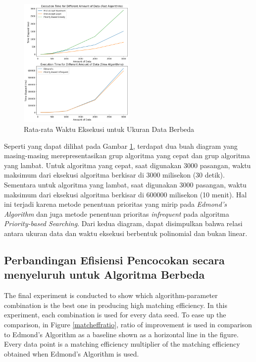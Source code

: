 \documentclass[conference]{IEEEtran}
\begin{document}
\begin{figure}[h]
    \includegraphics[width=0.5\textwidth]{images/execution_time_for_different_amount_of_data.png}
    \caption{Rata-rata Waktu Eksekusi untuk Ukuran Data Berbeda}
    \label{exctimedata}
\end{figure}

Seperti yang dapat dilihat pada Gambar \ref{exctimedata}, terdapat dua buah diagram yang masing-masing merepresentasikan grup
algoritma yang cepat dan grup algoritma yang lambat. Untuk algoritma yang cepat, saat digunakan 3000 pasangan, waktu maksimum
dari eksekusi algoritma berkisar di 3000 milisekon (30 detik). Sementara untuk algoritma yang lambat, saat digunakan 3000 pasangan,
waktu maksimum dari eksekusi algoritma berkisar di 600000 milisekon (10 menit). Hal ini terjadi karena metode penentuan prioritas
yang mirip pada \textit{Edmond's Algorithm} dan juga metode penentuan prioritas \textit{infrequent} pada algoritma
\textit{Priority-based Searching}. Dari kedua diagram, dapat disimpulkan bahwa relasi antara ukuran data dan waktu eksekusi berbentuk
polinomial dan bukan linear.

\subsection{Perbandingan Efisiensi Pencocokan secara menyeluruh untuk Algoritma Berbeda}
The final experiment is conducted to show which algorithm-parameter combination is the best one in producing high matching efficiency.
In this experiment, each combination is used for every data seed. To ease up the comparison, in Figure \ref{matcheffratio}, ratio of improvement is used
in comparison to Edmond's Algorithm as a baseline shown as a horizontal line in the figure. Every data point is a matching efficiency
multiplier of the matching efficiency obtained when Edmond's Algorithm is used.
\end{document}
